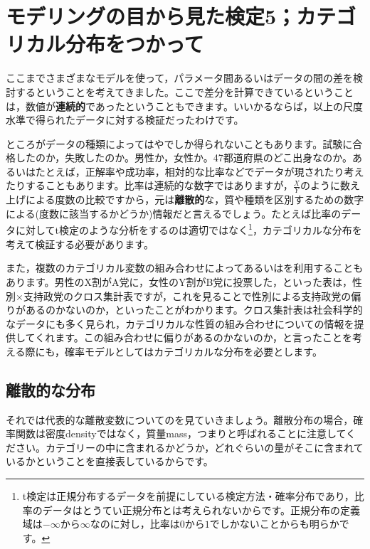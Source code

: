 \documentclass{ltjsbook}
\begin{document}
\VerbatimFootnotes
\chapter{モデリングの目から見た検定5；カテゴリカル分布をつかって}
\label{x23_modeling5}
ここまでさまざまなモデルを使って，パラメータ間あるいはデータの間の差を検討するということを考えてきました。ここで差分を計算できているということは，数値が\textbf{連続的}であったということもできます。いいかるならば，以上の尺度水準で得られたデータに対する検証だったわけです。

ところがデータの種類によってはやでしか得られないこともあります。試験に合格したのか，失敗したのか。男性か，女性か。47都道府県のどこ出身なのか。あるいはたとえば，正解率や成功率，相対的な比率などでデータが現されたり考えたりすることもあります。比率は連続的な数字ではありますが，$\frac{X}{Y}$のように数え上げによる度数の比較ですから，元は\textbf{離散的}な，質や種類を区別するための数字による(度数に該当するかどうか)情報だと言えるでしょう。たとえば比率のデータに対してt検定のような分析をするのは適切ではなく\footnote{t検定は正規分布するデータを前提にしている検定方法・確率分布であり，比率のデータはとうてい正規分布とは考えられないからです。正規分布の定義域は$-\infty$から$\infty$なのに対し，比率は$0$から$1$でしかないことからも明らかです。}，カテゴリカルな分布を考えて検証する必要があります。

また，複数のカテゴリカル変数の組み合わせによってあるいはを利用することもあります。男性のX割がA党に，女性のY割がB党に投票した，といった表は，性別$\times$支持政党のクロス集計表ですが，これを見ることで性別による支持政党の偏りがあるのかないのか，といったことがわかります。クロス集計表は社会科学的なデータにも多く見られ，カテゴリカルな性質の組み合わせについての情報を提供してくれます。この組み合わせに偏りがあるのかないのか，と言ったことを考える際にも，確率モデルとしてはカテゴリカルな分布を必要とします。

\section{離散的な分布}
\label{DDist}
それでは代表的な離散変数についてのを見ていきましょう。離散分布の場合，確率関数は密度densityではなく，質量mass，つまりと呼ばれることに注意してください。カテゴリーの中に含まれるかどうか，どれぐらいの量がそこに含まれているかということを直接表しているからです。
\end{document}
